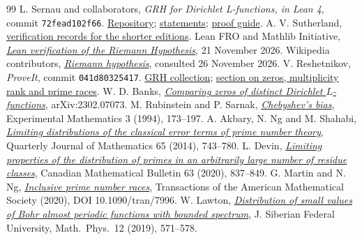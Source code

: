 \begin{thebibliography}{99}\small\setlength{\itemsep}{0.5pt}\setlength{\parsep}{0pt}\setlength{\parskip}{0pt}
 L. Sernau and collaborators, \emph{GRH for Dirichlet L-functions, in Lean 4}, commit \texttt{72fead102f66}. \href{https://github.com/lsernau/grh-lean/tree/72fead102f663d5c7a407964a13dc0cf9d977207}{Repository}; \href{https://github.com/lsernau/grh-lean/blob/72fead102f663d5c7a407964a13dc0cf9d977207/grh/src/Statements.lean}{statements}; \href{https://github.com/lsernau/grh-lean/blob/72fead102f663d5c7a407964a13dc0cf9d977207/grh/GUIDE.md}{proof guide}. A. V. Sutherland, \href{https://math.mit.edu/~drew/shortgrh/}{verification records for the shorter editions}.
 Lean FRO and Mathlib Initiative, \href{https://leanprover-community.github.io/blog/posts/riemann-hypothesis/}{\emph{Lean verification of the Riemann Hypothesis}}, 21 November 2026.
 Wikipedia contributors, \href{https://en.wikipedia.org/wiki/Riemann_hypothesis}{\emph{Riemann hypothesis}}, consulted 26 November 2026.
 V. Reshetnikov, \emph{ProveIt}, commit \texttt{041d80325417}. \href{https://github.com/VladimirReshetnikov/ProveIt/tree/041d8032541746f2ac2e686fbe437f8092771670/Analysis/GeneralizedRiemannHypothesis}{GRH collection}; \href{https://github.com/VladimirReshetnikov/ProveIt/blob/041d8032541746f2ac2e686fbe437f8092771670/Analysis/GeneralizedRiemannHypothesis/Article/sections/zer.tex}{section on zeros, multiplicity rank and prime races}.
 W. D. Banks, \href{https://arxiv.org/abs/2302.07073}{\emph{Comparing zeros of distinct Dirichlet \(L\)-functions}}, arXiv:2302.07073.
 M. Rubinstein and P. Sarnak, \href{https://doi.org/10.1080/10586458.1994.10504289}{\emph{Chebyshev's bias}}, Experimental Mathematics 3 (1994), 173--197.
 A. Akbary, N. Ng and M. Shahabi, \href{https://arxiv.org/abs/1306.1657}{\emph{Limiting distributions of the classical error terms of prime number theory}}, Quarterly Journal of Mathematics 65 (2014), 743--780.
 L. Devin, \href{https://doi.org/10.4153/S0008439520000089}{\emph{Limiting properties of the distribution of primes in an arbitrarily large number of residue classes}}, Canadian Mathematical Bulletin 63 (2020), 837--849.
 G. Martin and N. Ng, \href{https://arxiv.org/abs/1710.00088}{\emph{Inclusive prime number races}}, Transactions of the American Mathematical Society (2020), DOI 10.1090/tran/7996.
 W. Lawton, \href{https://arxiv.org/abs/1904.09373}{\emph{Distribution of small values of Bohr almost periodic functions with bounded spectrum}}, J. Siberian Federal University, Math.\ Phys.\ 12 (2019), 571--578.

\end{thebibliography}

